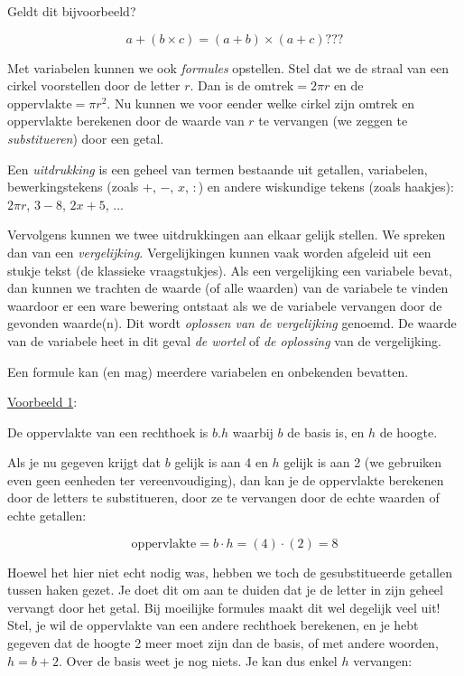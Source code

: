 Geldt dit bijvoorbeeld?

\begin{equation*}
a + (b \times{} c) = (a + b) \times{} (a + c) ???
\end{equation*}

\medskip{}


\noindent Met variabelen kunnen we ook \emph{formules} opstellen.
Stel dat we de straal van een cirkel voorstellen door de letter $r$.
Dan is de $\mathrm{omtrek}=2\pi r$ en de $\mathrm{oppervlakte}=\pi r^{2}$.
Nu kunnen we voor eender welke cirkel zijn omtrek en oppervlakte berekenen
door de waarde van $r$ te vervangen (we zeggen te \emph{substitueren})
door een getal.

\medskip{}


\noindent Een \emph{uitdrukking} is een geheel van termen bestaande
uit getallen, variabelen, bewerkingstekens (zoals $+$, $-$, $x$, $:$) en andere
wiskundige tekens (zoals haakjes): $2\pi r$, $3-8$, $2x+5$, ...

\noindent Vervolgens kunnen we twee uitdrukkingen aan elkaar gelijk
stellen. We spreken dan van een \emph{vergelijking}. Vergelijkingen
kunnen vaak worden afgeleid uit een stukje tekst (de klassieke vraagstukjes).
Als een vergelijking een variabele bevat, dan kunnen we trachten de
waarde (of alle waarden) van de variabele te vinden waardoor er een
ware bewering ontstaat als we de variabele vervangen door de gevonden
waarde(n). Dit wordt \emph{oplossen van de vergelijking} genoemd.
De waarde van de variabele heet in dit geval \emph{de wortel} of \emph{de
oplossing} van de vergelijking.

\noindent Een formule kan (en mag) meerdere variabelen en onbekenden
bevatten. \medskip{}


\uline{Voorbeeld 1}:

De oppervlakte van een rechthoek is $b.h$ waarbij $b$ de basis is,
en $h$ de hoogte.

Als je nu gegeven krijgt dat $b$ gelijk is aan 4 en $h$ gelijk is
aan 2 (we gebruiken even geen eenheden ter vereenvoudiging), dan kan
je de oppervlakte berekenen door de letters te substitueren, door
ze te vervangen door de echte waarden of echte getallen:

\begin{equation*}
\mathrm{oppervlakte}=b\cdot h=(4)\cdot(2)=8
\end{equation*}

Hoewel het hier niet echt nodig was, hebben we toch de gesubstitueerde
getallen tussen haken gezet. Je doet dit om aan te duiden dat je de
letter in zijn geheel vervangt door het getal. Bij moeilijke formules
maakt dit wel degelijk veel uit! Stel, je wil de oppervlakte van een
andere rechthoek berekenen, en je hebt gegeven dat de hoogte 2 meer
moet zijn dan de basis, of met andere woorden, $h=b+2$. Over de basis
weet je nog niets. Je kan dus enkel $h$ vervangen:

